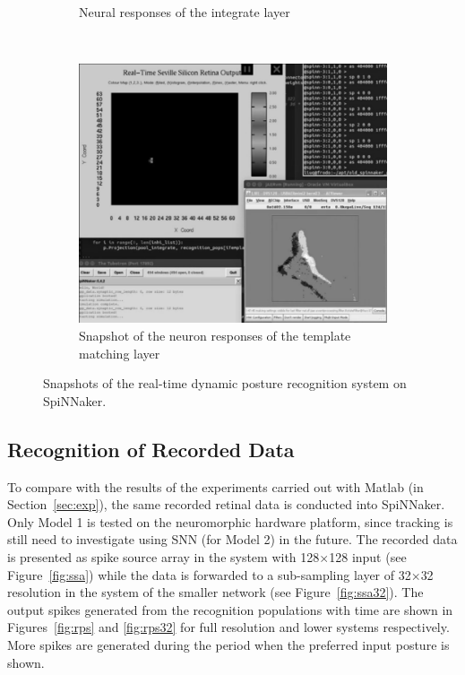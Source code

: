 \documentclass[journal]{journal}
\begin{document}
\begin{figure}
\begin{subfigure}[t]{0.24\textwidth}
		\caption{Neural responses of the integrate layer~\cite{video2}}
	    \label{fig:live2}
	\end{subfigure}
	\\
	\begin{subfigure}[t]{0.48\textwidth}
		\includegraphics[width=\textwidth]{pics/live.png}
		\caption{Snapshot of the neuron responses of the template matching layer~\cite{video3}}
	    \label{fig:live3}
	\end{subfigure}	

\caption{Snapshots of the real-time dynamic posture recognition system on SpiNNaker.
}
\label{fig:live}
\end{figure}

\subsection{Recognition of Recorded Data}
To compare with the results of the experiments carried out with Matlab (in Section~\ref{sec:exp}), the same recorded retinal data is conducted into SpiNNaker.
Only Model 1 is tested on the neuromorphic hardware platform, since tracking is still need to investigate using SNN (for Model 2) in the future. 
The recorded data is presented as spike source array in the system with 128$\times$128 input (see Figure~\ref{fig:ssa}) while the data is forwarded to a sub-sampling layer of 32$\times$32 resolution in the system of the smaller network (see Figure~\ref{fig:ssa32}). 
The output spikes generated from the recognition populations with time are shown in Figures~\ref{fig:rps} and \ref{fig:rps32} for full resolution and lower systems respectively. 
More spikes are generated during the period when the preferred input posture is shown. 
\end{document}
